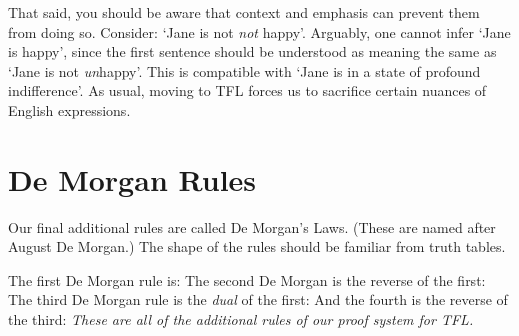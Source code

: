 That said, you should be aware that context and emphasis can prevent them from doing so. Consider: `Jane is not \emph{not} happy'. Arguably, one cannot infer `Jane is happy', since the first sentence should be understood as meaning the same as  `Jane is not \emph{un}happy'. This is compatible with `Jane is in a state of profound indifference'. As usual, moving to TFL forces us to sacrifice certain nuances of English expressions.

\section{De Morgan Rules}
Our final additional rules are called De Morgan's Laws. (These are named after August De Morgan.) The shape of the rules should be familiar from truth tables.

The first De Morgan rule is:
The second De Morgan is the reverse of the first:
The third De Morgan rule is the \emph{dual} of the first:
And the fourth is the reverse of the third:
\emph{These are all of the additional rules of our proof system for TFL.}

